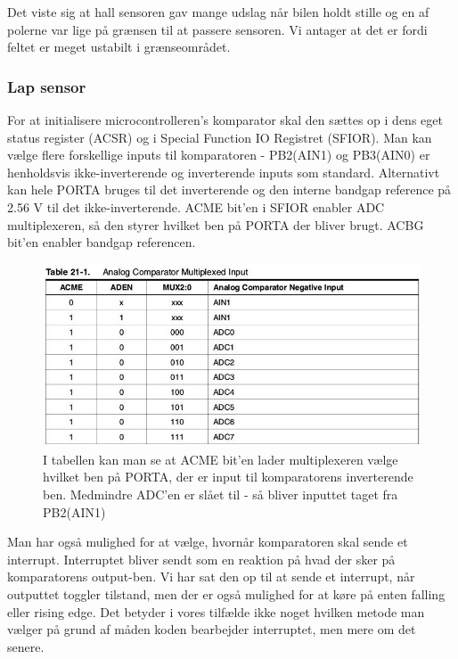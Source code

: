 Det viste sig at hall sensoren gav mange udslag når bilen holdt stille og en af polerne var lige på grænsen til at passere sensoren. Vi antager at det er fordi feltet er meget ustabilt i grænseområdet. 


\subsubsection{Lap sensor}

For at initialisere microcontrolleren's komparator skal den sættes op i dens eget status register (ACSR) og i Special Function IO Registret (SFIOR). Man kan vælge flere forskellige inputs til komparatoren - PB2(AIN1) og PB3(AIN0) er henholdsvis ikke-inverterende og inverterende inputs som standard. Alternativt kan hele PORTA bruges til det inverterende og den interne bandgap reference på 2.56 V til det ikke-inverterende.  ACME bit'en i SFIOR enabler ADC multiplexeren, så den styrer hvilket ben på PORTA der bliver brugt. ACBG bit'en enabler bandgap referencen.

\begin{figure}[h]

	\centering
		\includegraphics[scale=0.3]{Billeder/Table21-1.jpg}
	\caption{I tabellen kan man se at ACME bit'en lader multiplexeren vælge hvilket ben på PORTA, der er input til komparatorens inverterende ben. Medmindre ADC'en er slået til - så bliver inputtet taget fra PB2(AIN1)}
	\label{fig:ACME}
	
\end{figure}

Man har også mulighed for at vælge, hvornår komparatoren skal sende et interrupt. Interruptet bliver sendt som en reaktion på hvad der sker på komparatorens output-ben. Vi har sat den op til at sende et interrupt, når outputtet toggler tilstand, men der er også mulighed for at køre på enten falling eller rising edge. Det betyder i vores tilfælde ikke noget hvilken metode man vælger på grund af måden koden bearbejder interruptet, men mere om det senere.\\

